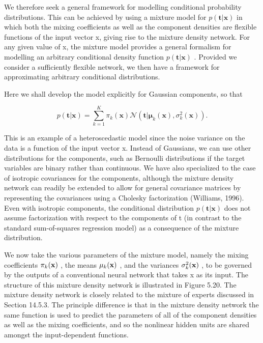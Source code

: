 \documentclass[
  10
]{article}
\begin{document}
We therefore seek a general framework for modelling conditional
probability distributions. This can be achieved by using a mixture model
for \(p ( \mathbf { t } | \mathbf { x } )\) in which both the mixing
coefficients as well as the component densities are flexible functions
of the input vector x, giving rise to the mixture density network. For
any given value of x, the mixture model provides a general formalism for
modelling an arbitrary conditional density function
\(p ( \mathbf { t } | \mathbf { x } )\) . Provided we consider a
sufficiently flexible network, we then have a framework for
approximating arbitrary conditional distributions.

Here we shall develop the model explicitly for Gaussian components, so
that

\[
p (\mathbf {t} | \mathbf {x}) = \sum_ {k = 1} ^ {K} \pi_ {k} (\mathbf {x}) \mathcal {N} \left(\mathbf {t} | \boldsymbol {\mu} _ {k} (\mathbf {x}), \sigma_ {k} ^ {2} (\mathbf {x})\right).\tag{5.148}
\]

This is an example of a heteroscedastic model since the noise variance
on the data is a function of the input vector x. Instead of Gaussians,
we can use other distributions for the components, such as Bernoulli
distributions if the target variables are binary rather than continuous.
We have also specialized to the case of isotropic covariances for the
components, although the mixture density network can readily be extended
to allow for general covariance matrices by representing the covariances
using a Cholesky factorization (Williams, 1996). Even with isotropic
components, the conditional distribution
\(p ( \mathbf { t } | \mathbf { x } )\) does not assume factorization
with respect to the components of t (in contrast to the standard
sum-of-squares regression model) as a consequence of the mixture
distribution.

We now take the various parameters of the mixture model, namely the
mixing coefficients \(\pi _ { k } ( { \bf x } )\) , the means
\(\mu _ { k } ( { \bf x } )\) , and the variances
\(\sigma _ { k } ^ { 2 } ( { \bf x } )\) , to be governed by the outputs
of a conventional neural network that takes x as its input. The
structure of this mixture density network is illustrated in Figure 5.20.
The mixture density network is closely related to the mixture of experts
discussed in Section 14.5.3. The principle difference is that in the
mixture density network the same function is used to predict the
parameters of all of the component densities as well as the mixing
coefficients, and so the nonlinear hidden units are shared amongst the
input-dependent functions.
\end{document}
